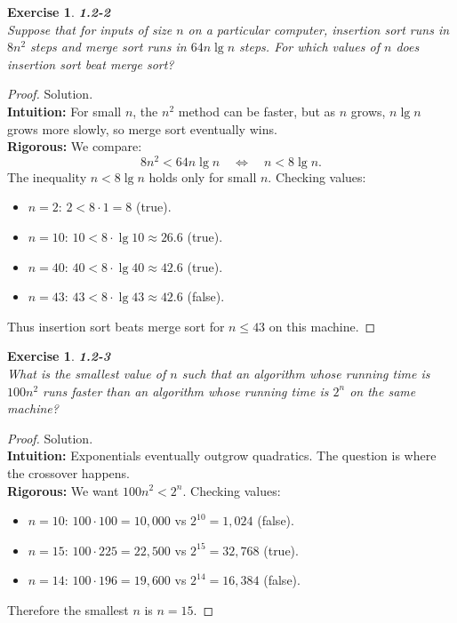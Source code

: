 \documentclass[12pt]{article}
\newtheorem{exercise}[theorem]{Exercise}
\theoremstyle{definition}
\begin{document}
\newpage

\begin{exercise}
\noindent
\textbf{1.2-2}\\
\noindent
Suppose that for inputs of size $n$ on a particular computer, insertion sort
runs in $8n^2$ steps and merge sort runs in $64n \lg n$ steps. For which values
of $n$ does insertion sort beat merge sort?
\end{exercise}

\vspace{1pt}

\begin{proof}
Solution.\\

\noindent
\textbf{Intuition:} For small $n$, the $n^2$ method can be faster, but as $n$
grows, $n \lg n$ grows more slowly, so merge sort eventually wins.\\

\noindent
\textbf{Rigorous:} We compare:
\[
8n^2 < 64n \lg n \quad \Longleftrightarrow \quad n < 8 \lg n.
\]
The inequality $n < 8 \lg n$ holds only for small $n$. Checking values:
\begin{itemize}
  \item $n=2$: $2 < 8\cdot 1 = 8$ (true).
  \item $n=10$: $10 < 8\cdot \lg 10 \approx 26.6$ (true).
  \item $n=40$: $40 < 8\cdot \lg 40 \approx 42.6$ (true).
  \item $n=43$: $43 < 8\cdot \lg 43 \approx 42.6$ (false).
\end{itemize}
Thus insertion sort beats merge sort for $n \leq 43$ on this machine.
\end{proof}

\newpage

\begin{exercise}
\noindent
\textbf{1.2-3}\\
\noindent
What is the smallest value of $n$ such that an algorithm whose running time
is $100n^2$ runs faster than an algorithm whose running time is $2^n$ on the
same machine?
\end{exercise}

\vspace{1pt}

\begin{proof}
Solution.\\

\noindent
\textbf{Intuition:} Exponentials eventually outgrow quadratics. The question is
where the crossover happens.\\

\noindent
\textbf{Rigorous:} We want $100n^2 < 2^n$. Checking values:
\begin{itemize}
  \item $n=10$: $100\cdot 100 = 10{,}000$ vs $2^{10} = 1{,}024$ (false).
  \item $n=15$: $100\cdot 225 = 22{,}500$ vs $2^{15} = 32{,}768$ (true).
  \item $n=14$: $100\cdot 196 = 19{,}600$ vs $2^{14} = 16{,}384$ (false).
\end{itemize}
Therefore the smallest $n$ is $n=15$.
\end{proof}
\end{document}

